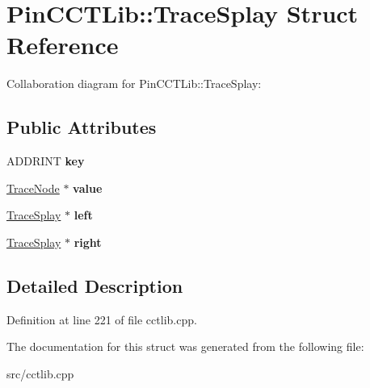 \hypertarget{structPinCCTLib_1_1TraceSplay}{\section{Pin\-C\-C\-T\-Lib\-:\-:Trace\-Splay Struct Reference}
\label{structPinCCTLib_1_1TraceSplay}
}


Collaboration diagram for Pin\-C\-C\-T\-Lib\-:\-:Trace\-Splay\-:
\subsection*{Public Attributes}
\begin{DoxyCompactItemize}
\item 
\hypertarget{structPinCCTLib_1_1TraceSplay_a888daea69b609ac41235910cecb6ef8c}{A\-D\-D\-R\-I\-N\-T {\bfseries key}}\label{structPinCCTLib_1_1TraceSplay_a888daea69b609ac41235910cecb6ef8c}

\item 
\hypertarget{structPinCCTLib_1_1TraceSplay_a56ccddc8138e50c2d66231f3a7a3f262}{\hyperlink{structPinCCTLib_1_1TraceNode}{Trace\-Node} $\ast$ {\bfseries value}}\label{structPinCCTLib_1_1TraceSplay_a56ccddc8138e50c2d66231f3a7a3f262}

\item 
\hypertarget{structPinCCTLib_1_1TraceSplay_a59bb033e6a97bb52308ce843e0304064}{\hyperlink{structPinCCTLib_1_1TraceSplay}{Trace\-Splay} $\ast$ {\bfseries left}}\label{structPinCCTLib_1_1TraceSplay_a59bb033e6a97bb52308ce843e0304064}

\item 
\hypertarget{structPinCCTLib_1_1TraceSplay_afa7608aad60bf7f20c947aa73adf08e1}{\hyperlink{structPinCCTLib_1_1TraceSplay}{Trace\-Splay} $\ast$ {\bfseries right}}\label{structPinCCTLib_1_1TraceSplay_afa7608aad60bf7f20c947aa73adf08e1}

\end{DoxyCompactItemize}


\subsection{Detailed Description}


Definition at line 221 of file cctlib.\-cpp.



The documentation for this struct was generated from the following file\-:\begin{DoxyCompactItemize}
\item 
src/cctlib.\-cpp\end{DoxyCompactItemize}
